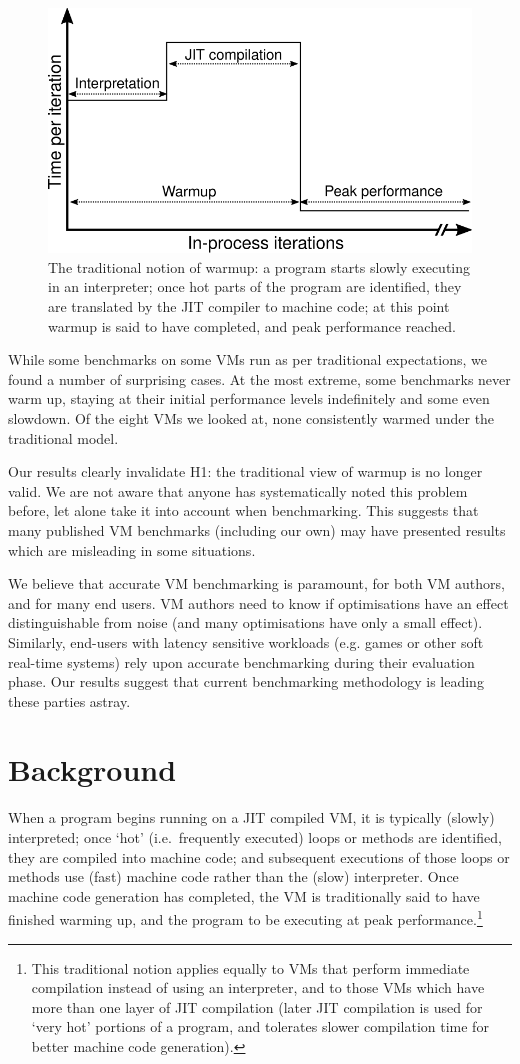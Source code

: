 \documentclass[preprint]{sigplanconf}
\begin{document}
\begin{figure}[t]
\centering
\includegraphics[width=.5\textwidth]{img/picturebook_warmup}
\caption{The traditional notion of warmup: a program starts slowly executing in
an interpreter; once hot parts of the program are identified, they are
translated by the JIT compiler to machine code; at this point warmup
is said to have completed, and peak performance reached.}
\label{fig:trad}
\end{figure}

While some benchmarks on some VMs run as per
traditional expectations, we found a number of surprising cases. At
the most extreme, some benchmarks never warm up, staying at their initial performance
levels indefinitely and some even slowdown. Of the eight
VMs we looked at, none consistently warmed under the traditional model.

Our results clearly invalidate H1: the traditional view of warmup is no longer
valid. We are not aware that anyone has systematically noted this
problem before, let alone take it into account when benchmarking. This suggests
that many published VM benchmarks (including our own) may have presented
results which are misleading in some situations.

We believe that accurate VM benchmarking is paramount, for both VM authors, and
for many end users. VM authors need to know if optimisations have an effect
distinguishable from noise (and many optimisations have only a small effect).
Similarly, end-users with latency sensitive workloads (e.g. games or other soft
real-time systems) rely upon accurate benchmarking during their evaluation
phase. Our results suggest that current benchmarking methodology is leading
these parties astray.

\section{Background}
\label{sec:warmup}

When a program begins running on a JIT compiled VM, it is typically (slowly)
interpreted; once `hot' (i.e.~frequently executed) loops or methods are
identified, they are compiled into machine code; and subsequent
executions of those loops or methods use (fast) machine code rather than the
(slow) interpreter. Once machine code generation has completed, the VM is
traditionally said to have finished warming up, and the program to be executing
at peak performance.\footnote{This traditional notion applies equally to VMs
that perform immediate compilation instead of using an interpreter, and to
those VMs which have more than one layer of JIT compilation (later JIT
compilation is used for `very hot' portions of a program, and tolerates slower
compilation time for better machine code generation).}
\end{document}
